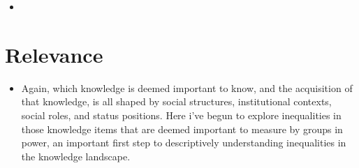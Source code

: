 \documentclass[]{article}
\begin{document}
\begin{itemize}
  \item{}
\end{itemize}


\section{Relevance}
\begin{itemize}
  \item{Again, which knowledge is deemed important to know, and the acquisition of that knowledge, is all shaped by social structures, institutional contexts, social roles, and status positions. Here i've begun to explore inequalities in those knowledge items that are deemed important to measure by groups in power, an important first step to descriptively understanding inequalities in the knowledge landscape.}
\end{itemize}
\end{document}
